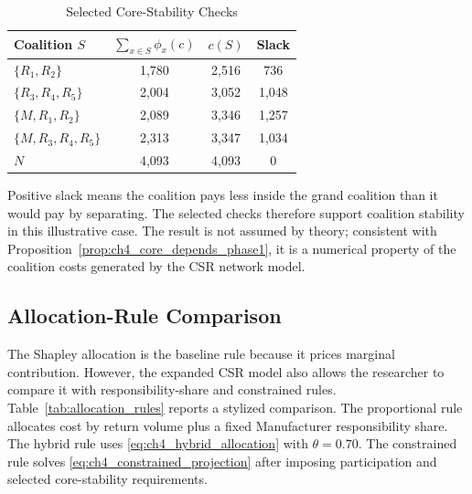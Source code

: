 \begin{table}[htbp]
\centering
\caption{Selected Core-Stability Checks}
\label{tab:core_check}
\begin{tabular}{lccc}
\toprule
\textbf{Coalition $S$} & $\sum_{x\in S}\phi_x(c)$ & $c(S)$ & \textbf{Slack} \\
\midrule
$\{R_1,R_2\}$ & 1,780 & 2,516 & 736 \\
$\{R_3,R_4,R_5\}$ & 2,004 & 3,052 & 1,048 \\
$\{M,R_1,R_2\}$ & 2,089 & 3,346 & 1,257 \\
$\{M,R_3,R_4,R_5\}$ & 2,313 & 3,347 & 1,034 \\
$N$ & 4,093 & 4,093 & 0 \\
\bottomrule
\end{tabular}
\end{table}

Positive slack means the coalition pays less inside the grand coalition than it would pay by separating. The selected checks therefore support coalition stability in this illustrative case. The result is not assumed by theory; consistent with Proposition~\ref{prop:ch4_core_depends_phase1}, it is a numerical property of the coalition costs generated by the CSR network model.

\subsection{Allocation-Rule Comparison}

The Shapley allocation is the baseline rule because it prices marginal contribution. However, the expanded CSR model also allows the researcher to compare it with responsibility-share and constrained rules. Table~\ref{tab:allocation_rules} reports a stylized comparison. The proportional rule allocates cost by return volume plus a fixed Manufacturer responsibility share. The hybrid rule uses \eqref{eq:ch4_hybrid_allocation} with $\theta=0.70$. The constrained rule solves \eqref{eq:ch4_constrained_projection} after imposing participation and selected core-stability requirements.

\begin{table}[htbp]
\centering
\caption{Allocation-Rule Comparison}
\label{tab:allocation_rules}
\end{table}

